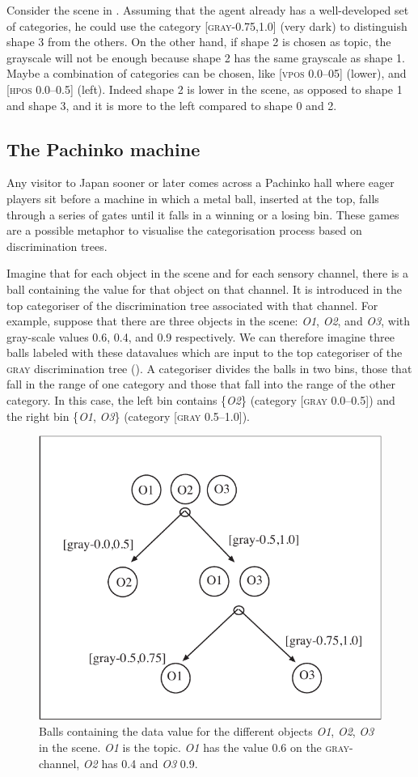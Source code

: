 Consider the scene in . Assuming that the agent
already has a well-developed set of categories, he could use 
the category [\textsc{gray}-0.75,1.0] (very dark) to distinguish 
shape 3 from the others. On the other hand, if shape 2 is 
chosen as topic, the grayscale will not be enough because
shape 2 has the same grayscale as shape 1. Maybe a 
combination of categories can be chosen, like [\textsc{vpos} 0.0–05]
(lower), and [\textsc{hpos} 0.0–0.5] (left). Indeed shape 2
is lower in the scene, as opposed to
shape 1 and shape 3, and it is more to the left compared \enlargethispage{1\baselineskip}
to shape 0 and 2.

\subsection{The Pachinko machine}

Any visitor to Japan sooner or later comes across a 
Pachinko hall where eager players sit before a 
machine in which a metal ball, inserted at the top, 
falls through a series of gates until it falls in 
a winning or a losing bin. These games are
a possible metaphor to visualise the categorisation process
based on discrimination trees. 

Imagine that for each object in
the scene and for each sensory channel, there is a ball
containing the value for that object on that channel. It
is introduced in the top categoriser of the 
discrimination tree associated with that channel. 
For example, suppose that there are three
objects in the scene: \emph{O1}, \emph{O2}, and \emph{O3}, 
with gray-scale values 0.6, 0.4, and 0.9 respectively. 
We can therefore imagine three balls labeled with these datavalues
which are input to the top categoriser of the 
\textsc{gray} discrimination tree (). 
A categoriser divides the balls in two bins, 
those that fall in the range of 
one category and those that fall into the range of the other
category. In this case, the left bin contains \{\emph{O2}\} 
(category [\textsc{gray} 0.0–0.5]) 
and the right bin \{\emph{O1}, \emph{O3}\} (category [\textsc{gray} 0.5–1.0]). 

\begin{figure}[b]
  \centerline{\includegraphics[width=.65\textwidth]{chap4/figs/balls.pdf}}
\caption{\label{balls}Balls containing
the data value for the different objects
\emph{O1}, \emph{O2}, \emph{O3} in the scene. \emph{O1} is the topic.
\emph{O1} has the value 0.6 on the \textsc{gray}-channel, \emph{O2} has
0.4 and \emph{O3} 0.9.} 
\end{figure}

